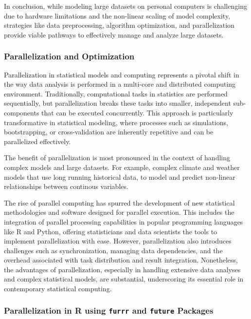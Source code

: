 \documentclass[12pt, twoside,hidelinks]{article}
\theoremstyle{definition}
\numberwithin{equation}{section}
\begin{document}
In conclusion, while modeling large datasets on personal computers is challenging due to hardware limitations and the non-linear scaling of model complexity, strategies like data preprocessing, algorithm optimization, and parallelization provide viable pathways to effectively manage and analyze large datasets.

\subsubsection{Parallelization and Optimization}

Parallelization in statistical models and computing represents a pivotal shift in the way data analysis is performed in a multi-core and distributed computing environment. Traditionally, computational tasks in statistics are performed sequentially, but parallelization breaks these tasks into smaller, independent sub-components that can be executed concurrently. This approach is particularly transformative in statistical modeling, where processes such as simulations, bootstrapping, or cross-validation are inherently repetitive and can be parallelized effectively.
\newline

The benefit of parallelization is most pronounced in the context of handling complex models and large datasets. For example, complex climate and weather models that use long running historical data, to model and predict non-linear relationships between continous variables. 
\newline

The rise of parallel computing has spurred the development of new statistical methodologies and software designed for parallel execution. This includes the integration of parallel processing capabilities in popular programming languages like R and Python, offering statisticians and data scientists the tools to implement parallelization with ease. However, parallelization also introduces challenges such as synchronization, managing data dependencies, and the overhead associated with task distribution and result integration. Nonetheless, the advantages of parallelization, especially in handling extensive data analyses and complex statistical models, are substantial, underscoring its essential role in contemporary statistical computing.

\subsubsection*{Parallelization in R using \texttt{furrr} and \texttt{future} Packages}
\end{document}
